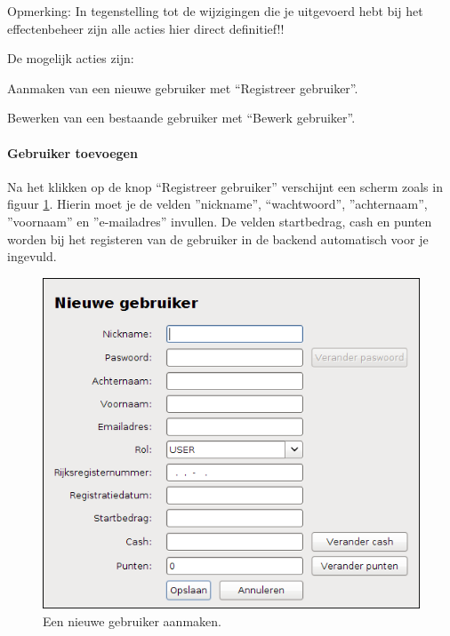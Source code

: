 Opmerking: In tegenstelling tot de wijzigingen die je uitgevoerd hebt bij het effectenbeheer zijn alle acties hier direct definitief!!

De mogelijk acties zijn:
\begin{itemize_compact}
\item{Aanmaken van een nieuwe gebruiker met ``Registreer gebruiker''.}
\item{Bewerken van een bestaande gebruiker met ``Bewerk gebruiker''.}
\end{itemize_compact}

\paragraph{Gebruiker toevoegen}

Na het klikken op de knop ``Registreer gebruiker'' verschijnt een scherm zoals in figuur \ref{fig:handl:admin:gebruikers-nieuw}. Hierin moet je de velden ''nickname'', ``wachtwoord'', ''achternaam'', ''voornaam'' en ''e-mailadres'' invullen. 
De velden startbedrag, cash en punten worden bij het registeren van de gebruiker in de backend automatisch voor je ingevuld.

\begin{figure}[h!]
	\centering
		\includegraphics[scale=0.75]{images/handleiding/administratie/gebruikers-nieuw}
	\caption{Een nieuwe gebruiker aanmaken.}
		\label{fig:handl:admin:gebruikers-nieuw}
\end{figure}

